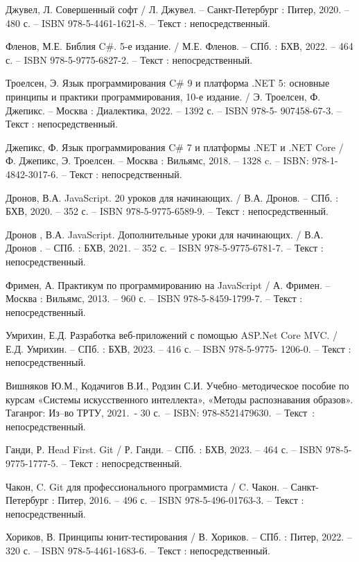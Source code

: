 \begin{thebibliography}{9}
 Джувел, Л. Совершенный софт / Л. Джувел. – Санкт-Петербург : Питер, 2020. – 480 с. – ISBN 978-5-4461-1621-8. – Текст : непосредственный.

 	Фленов, М.Е. Библия C\#. 5-е издание. / М.Е. Фленов. – СПб. : БХВ, 2022. – 464 с. – ISBN 978-5-9775-6827-2. – Текст : непосредственный.

	 Троелсен, Э. Язык программирования C\# 9 и платформа .NET 5: основные принципы и практики программирования, 10-е издание. / Э. Троелсен, Ф. Джепикс. – Москва : Диалектика, 2022. – 1392 с. – ISBN 978-5- 907458-67-3. – Текст : непосредственный.

  Джепикс, Ф. Язык программирования C\# 7 и платформы .NET и
.NET Core / Ф. Джепикс, Э. Троелсен. – Москва : Вильямс, 2018. – 1328 c. – ISBN: 978-1-4842-3017-6. – Текст : непосредственный.


 Дронов, В.А. JavaScript. 20 уроков для начинающих. / В.А. Дронов. – СПб. : БХВ, 2020. – 352 с. – ISBN 978-5-9775-6589-9. – Текст :
непосредственный.

 Дронов , В.А. JavaScript. Дополнительные уроки для начинающих. / В.А. Дронов . – СПб. : БХВ, 2021. – 352 с. – ISBN 978-5-9775-6781-7. – Текст :
непосредственный.

 Фримен, А. Практикум по программированию на JavaScript / А. Фримен. – Москва : Вильямс, 2013. – 960 с. – ISBN 978-5-8459-1799-7. –
Текст : непосредственный.

 Умрихин, Е.Д. Разработка веб-приложений с помощью ASP.Net Core MVC. / Е.Д. Умрихин. – СПб. : БХВ, 2023. – 416 с. – ISBN 978-5-9775-
1206-0. – Текст : непосредственный.


 Вишняков Ю.М., Кодачигов В.И., Родзин С.И. Учебно–методическое пособие по курсам «Системы искусственного интеллекта», «Методы распознавания образов». Таганрог: Из–во ТРТУ, 2021.~- 30 с.~– ISBN: 978-8521479630.~– Текст~: непосредственный.

	Ганди, Р. Head First. Git / Р. Ганди. – СПб. : БХВ, 2023. – 464 с. – ISBN 978-5-9775-1777-5. – Текст : непосредственный.

 Чакон, C. Git для профессионального программиста / C. Чакон. – Санкт-Петербург : Питер, 2016. – 496 с. – ISBN 978-5-496-01763-3. – Текст : непосредственный.

 Хориков, В. Принципы юнит-тестирования / В. Хориков. – СПб. : Питер, 2022. – 320 с. – ISBN 978-5-4461-1683-6. – Текст : непосредственный.


\end{thebibliography}
